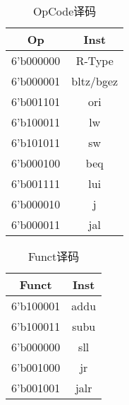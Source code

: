 \documentclass[UTF8]{ctexart}
\begin{document}
\begin{table}[H]
	\centering
	\begin{threeparttable}
		\caption{OpCode译码}
		\begin{tabular}{cc}
			\toprule
			\rowcolor{mypink}
			\textbf{Op} & \textbf{Inst} \\
			\midrule
			6'b000000   & R-Type        \\
			\midrule
			6'b000001   & bltz/bgez     \\
			\midrule
			6'b001101   & ori           \\
			\midrule
			6'b100011   & lw            \\
			\midrule
			6'b101011   & sw            \\
			\midrule
			6'b000100   & beq           \\
			\midrule
			6'b001111   & lui           \\
			\midrule
			6'b000010   & j             \\
			\midrule
			6'b000011   & jal           \\
			\midrule
		\end{tabular}
	\end{threeparttable}
\end{table}
\begin{table}[H]
	\centering
	\begin{threeparttable}
		\caption{Funct译码}
		\begin{tabular}{cc}
			\toprule
			\rowcolor{mypink}
			\textbf{Funct} & \textbf{Inst} \\
			\midrule
			6'b100001      & addu          \\
			\midrule
			6'b100011      & subu          \\
			\midrule
			6'b000000      & sll           \\
			\midrule
			6'b001000      & jr            \\
			\midrule
			6'b001001      & jalr          \\
			\midrule
		\end{tabular}
	\end{threeparttable}
\end{table}
\end{document}
